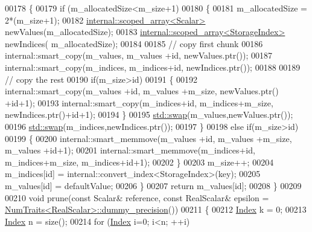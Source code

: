 \begin{DoxyCode}
00178       \{
00179         \textcolor{keywordflow}{if} (m\_allocatedSize<m\_size+1)
00180         \{
00181           m\_allocatedSize = 2*(m\_size+1);
00182           \hyperlink{class_eigen_1_1internal_1_1scoped__array}{internal::scoped\_array<Scalar>} newValues(m\_allocatedSize);
00183           \hyperlink{class_eigen_1_1internal_1_1scoped__array}{internal::scoped\_array<StorageIndex>} newIndices(
      m\_allocatedSize);
00184 
00185           \textcolor{comment}{// copy first chunk}
00186           internal::smart\_copy(m\_values,  m\_values +\textcolor{keywordtype}{id}, newValues.ptr());
00187           internal::smart\_copy(m\_indices, m\_indices+\textcolor{keywordtype}{id}, newIndices.ptr());
00188 
00189           \textcolor{comment}{// copy the rest}
00190           \textcolor{keywordflow}{if}(m\_size>\textcolor{keywordtype}{id})
00191           \{
00192             internal::smart\_copy(m\_values +\textcolor{keywordtype}{id},  m\_values +m\_size, newValues.ptr() +\textcolor{keywordtype}{id}+1);
00193             internal::smart\_copy(m\_indices+\textcolor{keywordtype}{id},  m\_indices+m\_size, newIndices.ptr()+\textcolor{keywordtype}{id}+1);
00194           \}
00195           \hyperlink{endian_8c_a3ca5ecd34b04d6a243c054ac3a57f68d}{std::swap}(m\_values,newValues.ptr());
00196           \hyperlink{endian_8c_a3ca5ecd34b04d6a243c054ac3a57f68d}{std::swap}(m\_indices,newIndices.ptr());
00197         \}
00198         \textcolor{keywordflow}{else} \textcolor{keywordflow}{if}(m\_size>\textcolor{keywordtype}{id})
00199         \{
00200           internal::smart\_memmove(m\_values +\textcolor{keywordtype}{id}, m\_values +m\_size, m\_values +\textcolor{keywordtype}{id}+1);
00201           internal::smart\_memmove(m\_indices+\textcolor{keywordtype}{id}, m\_indices+m\_size, m\_indices+\textcolor{keywordtype}{id}+1);
00202         \}
00203         m\_size++;
00204         m\_indices[id] = internal::convert\_index<StorageIndex>(key);
00205         m\_values[id] = defaultValue;
00206       \}
00207       \textcolor{keywordflow}{return} m\_values[id];
00208     \}
00209 
00210     \textcolor{keywordtype}{void} prune(\textcolor{keyword}{const} Scalar& reference, \textcolor{keyword}{const} RealScalar& epsilon = 
      \hyperlink{group___core___module_struct_eigen_1_1_num_traits}{NumTraits<RealScalar>::dummy\_precision}())
00211     \{
00212       \hyperlink{namespace_eigen_a62e77e0933482dafde8fe197d9a2cfde}{Index} k = 0;
00213       \hyperlink{namespace_eigen_a62e77e0933482dafde8fe197d9a2cfde}{Index} n = size();
00214       \textcolor{keywordflow}{for} (\hyperlink{namespace_eigen_a62e77e0933482dafde8fe197d9a2cfde}{Index} i=0; i<n; ++i)

\end{DoxyCode}
